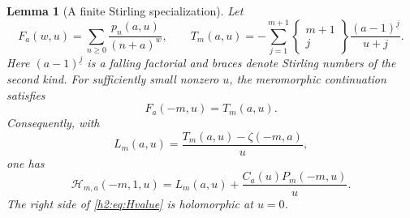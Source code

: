 \documentclass[11pt,a4paper]{article}
\newtheorem{lemma}[theorem]{Lemma}
\theoremstyle{definition}
\theoremstyle{remark}
\numberwithin{equation}{section}
\begin{document}
\begin{lemma}[A finite Stirling specialization]
\label{h2:lem:stirling}
Let
\[
 F_a(w,u)=\sum_{n\ge0}\frac{p_n(a,u)}{(n+a)^w},\qquad
 T_m(a,u)=-\sum_{j=1}^{m+1}
   \left\{\begin{matrix}m+1\\j\end{matrix}\right\}
      \frac{(a-1)^{\underline j}}{u+j}.
\]
Here $(a-1)^{\underline j}$ is a falling factorial and braces denote
Stirling numbers of the second kind. For sufficiently small nonzero
$u$, the meromorphic continuation satisfies
\begin{equation}\label{h2:eq:Fnegative}
 F_a(-m,u)=T_m(a,u).
\end{equation}
Consequently, with
\begin{equation}\label{h2:eq:L}
 L_m(a,u)=\frac{T_m(a,u)-\zeta(-m,a)}u,
\end{equation}
one has
\begin{equation}\label{h2:eq:Hvalue}
 \mathcal H_{m,a}(-m,1,u)
   =L_m(a,u)+\frac{C_a(u)P_m(-m,u)}u.
\end{equation}
The right side of \eqref{h2:eq:Hvalue} is holomorphic at $u=0$.
\end{lemma}
\end{document}
